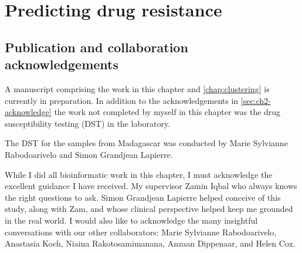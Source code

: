\chapter{Predicting \mtb{} drug resistance}
\label{chap:dst}
\ifpdf
    \graphicspath{{Chapter3/Figs/Raster/}{Chapter3/Figs/PDF/}{Chapter3/Figs/}}
\else
    \graphicspath{{Chapter3/Figs/Vector/}{Chapter3/Figs/}}
\fi


\setcounter{section}{-1}
\section{Publication and collaboration acknowledgements}
\label{sec:ch3-acknowledge}

A manuscript comprising the work in this chapter and \autoref{chap:clustering} is currently in preparation. In addition to the acknowledgements in \autoref{sec:ch2-acknowledge} the work not completed by myself in this chapter was the drug susceptibility testing (DST) in the laboratory.


The DST for the samples from Madagascar was conducted by Marie Sylvianne Rabodoarivelo and Simon Grandjean Lapierre. 




While I did all bioinformatic work in this chapter, I must acknowledge the excellent guidance I have received. My supervisor Zamin Iqbal who always knows the right questions to ask. Simon Grandjean Lapierre helped conceive of this study, along with Zam, and whose clinical perspective helped keep me grounded in the real world. I would also like to acknowledge the many insightful conversations with our other collaborators: Marie Sylvianne Rabodoarivelo, Anastasia Koch, Niaina Rakotosamimanana, Anzaan Dippenaar, and Helen Cox. 

